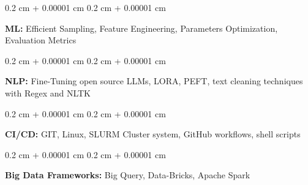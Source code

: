 \documentclass[10pt, letterpaper]{article}
\newenvironment{onecolentry}{
    \begin{adjustwidth}{
        0.2 cm + 0.00001 cm
    }{
        0.2 cm + 0.00001 cm
    }
}{
    \end{adjustwidth}
} %
\begin{document}
        \vspace{0.2 cm}

        \begin{onecolentry}
            \textbf{ML:} Efficient Sampling, Feature Engineering, Parameters Optimization, Evaluation Metrics
        \end{onecolentry}

        \vspace{0.2 cm}

        \begin{onecolentry}
            \textbf{NLP:} Fine-Tuning open source LLMs, LORA, PEFT, text cleaning techniques with Regex and NLTK
        \end{onecolentry}

        \vspace{0.2 cm}

        \begin{onecolentry}
            \textbf{CI/CD:} GIT, Linux, SLURM Cluster system, GitHub workflows, shell scripts
        \end{onecolentry}

        \vspace{0.2 cm}

        \begin{onecolentry}
            \textbf{Big Data Frameworks:} Big Query, Data-Bricks, Apache Spark
        \end{onecolentry}


    
\end{document}
